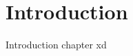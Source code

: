 \chapter*{Introduction} %

Introduction chapter
xd

\cite{jacobs2023exploit}
\cite{shimizu2026vulnerability}
\cite{le2022survey}
